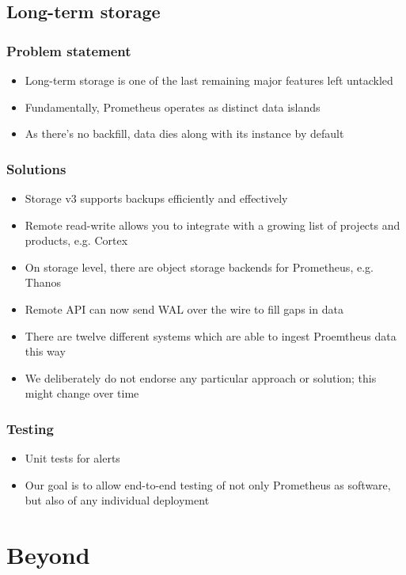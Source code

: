 \documentclass[aspectratio=169]{beamer}
\begin{document}
\subsection{Long-term storage}

\begin{frame}
	\frametitle{Problem statement}
	\begin{itemize}
		\item Long-term storage is one of the last remaining major features left untackled
		\item Fundamentally, Prometheus operates as distinct data islands
		\item As there's no backfill, data dies along with its instance by default
	\end{itemize}
\end{frame}

\begin{frame}
	\frametitle{Solutions}
	\begin{itemize}
		\item Storage v3 supports backups efficiently and effectively
		\item Remote read-write allows you to integrate with a growing list of projects and products, e.g. Cortex
		\item On storage level, there are object storage backends for Prometheus, e.g. Thanos
		\item Remote API can now send WAL over the wire to fill gaps in data
		\item There are twelve different systems which are able to ingest Proemtheus data this way
		\item We deliberately do not endorse any particular approach or solution; this might change over time
	\end{itemize}
\end{frame}

\begin{frame}
	\frametitle{Testing}
	\begin{itemize}
		\item Unit tests for alerts
		\item Our goal is to allow end-to-end testing of not only Prometheus as software, but also of any individual deployment
	\end{itemize}
\end{frame}

\section{Beyond}
\end{document}
